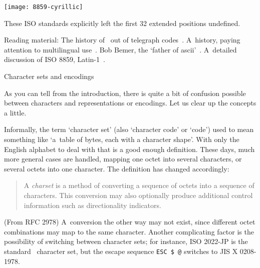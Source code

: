 \texttt{[image: 8859-cyrillic]}

These ISO standards
explicitly left the first 32 extended positions undefined. 

Reading material: The history of \ascii\ out of
telegraph codes~\cite{history-of-ascii}. A~history, paying
attention to multilingual use~\cite{character-codes-europe-asia}.
Bob Bemer, the `father of ascii'~\cite{bobbemer}.
A~detailed discussion of ISO 8859, Latin-1~\cite{latin1}.

 {Character sets and encodings}

As you can tell from the introduction, there is quite a bit of
confusion possible between characters and representations or
encodings. Let us clear up the concepts a little.

Informally, the term `character set' (also `character code' or `code')
used to mean something like `a~table of
bytes, each with a character shape'. With only the English alphabet to
deal with that is a good enough definition. These days, much more general
cases are handled, mapping one octet into several characters, or
several octets into one character. The definition has changed
accordingly:
\begin{quote}
A \emph{charset} is
a method of   converting a sequence of octets into a sequence of
characters.  This   conversion may also optionally produce additional
control information   such as directionality indicators.
\end{quote}
(From RFC 2978) A~conversion the other way may not exist, since
different octet combinations may map to the same character.  Another
complicating factor is the possibility of switching between character
sets; for instance, ISO 2022-JP is the standard
\ascii\ character set, but the escape sequence \verb+ESC $ @+ switches
to JIS X 0208-1978.


